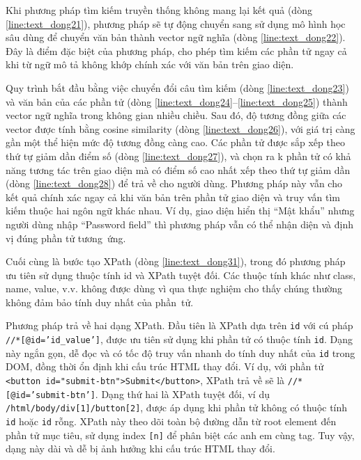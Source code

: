 \documentclass[a4paper, 12pt]{report}
\begin{document}
{Khi phương pháp tìm kiếm truyền thống không mang lại kết quả (dòng \ref{line:text_dong21}), phương pháp sẽ tự động chuyển sang sử dụng mô hình học sâu dùng để chuyển văn bản thành vector ngữ nghĩa (dòng \ref{line:text_dong22}). Đây là điểm đặc biệt của phương pháp, cho phép tìm kiếm các phần tử ngay cả khi từ ngữ mô tả không khớp chính xác với văn bản trên giao diện. 


Quy trình bắt đầu bằng việc chuyển đổi câu tìm kiếm (dòng \ref{line:text_dong23}) và văn bản của các phần tử (dòng \ref{line:text_dong24}–\ref{line:text_dong25}) thành vector ngữ nghĩa trong không gian nhiều chiều. Sau đó, độ tương đồng giữa các vector được tính bằng cosine similarity (dòng \ref{line:text_dong26}), với giá trị càng gần một thể hiện mức độ tương đồng càng cao. Các phần tử được sắp xếp theo thứ tự giảm dần điểm số (dòng \ref{line:text_dong27}), và chọn ra k phần tử có khả năng tương tác trên giao diện mà có điểm số cao nhất xếp theo thứ tự giảm dần (dòng \ref{line:text_dong28}) để trả về cho người dùng. Phương pháp này vẫn cho kết quả chính xác ngay cả khi văn bản trên phần tử giao diện và truy vấn tìm kiếm thuộc hai ngôn ngữ khác nhau. Ví dụ, giao diện hiển thị “Mật khẩu” nhưng người dùng nhập “Password field” thì phương pháp vẫn có thể nhận diện và định vị đúng phần tử tương~ứng. 


Cuối cùng là bước tạo XPath (dòng \ref{line:text_dong31}), trong đó phương pháp ưu tiên sử dụng thuộc tính id và XPath tuyệt đối. Các thuộc tính khác như class, name, value, v.v. không được dùng vì qua thực nghiệm cho thấy chúng thường không đảm bảo tính duy nhất của phần~tử.

Phương pháp trả về hai dạng XPath. Đầu tiên là XPath dựa trên \texttt{id} với cú pháp \texttt{//*[@id='id\_value']}, được ưu tiên sử dụng khi phần tử có thuộc tính \texttt{id}. Dạng này ngắn gọn, dễ đọc và có tốc độ truy vấn nhanh do tính duy nhất của \texttt{id} trong DOM, đồng thời ổn định khi cấu trúc HTML thay đổi. Ví dụ, với phần tử \texttt{<button id="submit-btn">Submit</button>}, XPath trả về sẽ là \texttt{//*[@id='submit-btn']}. Dạng thứ hai là XPath tuyệt đối, ví dụ \texttt{/html/body/div[1]/button[2]}, được áp dụng khi phần tử không có thuộc tính \texttt{id} hoặc \texttt{id} rỗng. XPath này theo dõi toàn bộ đường dẫn từ root element đến phần tử mục tiêu, sử dụng index \texttt{[n]} để phân biệt các anh em cùng tag. Tuy vậy, dạng này dài và dễ bị ảnh hưởng khi cấu trúc HTML thay đổi.






}
\end{document}
